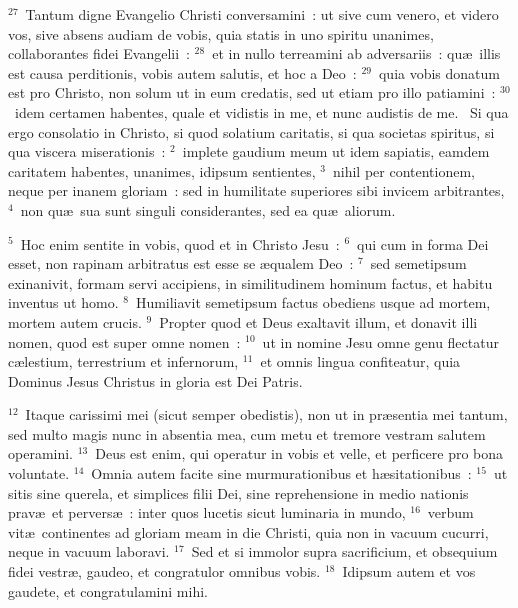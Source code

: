 ${}^{27}$~Tantum digne Evangelio Christi conversamini~: ut sive cum venero, et videro vos, sive absens audiam de vobis, quia statis in uno spiritu unanimes, collaborantes fidei Evangelii~:
${}^{28}$~et in nullo terreamini ab adversariis~: qu\ae\ illis est causa perditionis, vobis autem salutis, et hoc a Deo~:
${}^{29}$~quia vobis donatum est pro Christo, non solum ut in eum credatis, sed ut etiam pro illo patiamini~:
${}^{30}$~idem certamen habentes, quale et vidistis in me, et nunc audistis de me.
~\lettrine[lines=10,image=true,loversize=0.05,lraise=-0.03]{S}{}i qua ergo consolatio in Christo, si quod solatium caritatis, si qua societas spiritus, si qua viscera miserationis~:
${}^{2}$~implete gaudium meum ut idem sapiatis, eamdem caritatem habentes, unanimes, idipsum sentientes,
${}^{3}$~nihil per contentionem, neque per inanem gloriam~: sed in humilitate superiores sibi invicem arbitrantes,
${}^{4}$~non qu\ae\ sua sunt singuli considerantes, sed ea qu\ae\ aliorum.


${}^{5}$~Hoc enim sentite in vobis, quod et in Christo Jesu~:
${}^{6}$~qui cum in forma Dei esset, non rapinam arbitratus est esse se \ae qualem Deo~:
${}^{7}$~sed semetipsum exinanivit, formam servi accipiens, in similitudinem hominum factus, et habitu inventus ut homo.
${}^{8}$~Humiliavit semetipsum factus obediens usque ad mortem, mortem autem crucis.
${}^{9}$~Propter quod et Deus exaltavit illum, et donavit illi nomen, quod est super omne nomen~:
${}^{10}$~ut in nomine Jesu omne genu flectatur c\ae lestium, terrestrium et infernorum,
${}^{11}$~et omnis lingua confiteatur, quia Dominus Jesus Christus in gloria est Dei Patris.


${}^{12}$~Itaque carissimi mei (sicut semper obedistis), non ut in pr\ae sentia mei tantum, sed multo magis nunc in absentia mea, cum metu et tremore vestram salutem operamini.
${}^{13}$~Deus est enim, qui operatur in vobis et velle, et perficere pro bona voluntate.
${}^{14}$~Omnia autem facite sine murmurationibus et h\ae sitationibus~:
${}^{15}$~ut sitis sine querela, et simplices filii Dei, sine reprehensione in medio nationis prav\ae\ et pervers\ae~: inter quos lucetis sicut luminaria in mundo,
${}^{16}$~verbum vit\ae\ continentes ad gloriam meam in die Christi, quia non in vacuum cucurri, neque in vacuum laboravi.
${}^{17}$~Sed et si immolor supra sacrificium, et obsequium fidei vestr\ae , gaudeo, et congratulor omnibus vobis.
${}^{18}$~Idipsum autem et vos gaudete, et congratulamini mihi.


